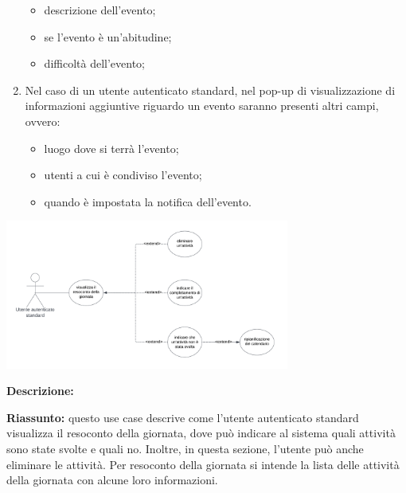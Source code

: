 \begin{listaPersonale}[UC]{}
\begin{enumerate}
\begin{itemize}
                  \item descrizione dell'evento;
                  \item se l'evento è un'abitudine;
                  \item difficoltà dell'evento;
              \end{itemize}
        \item Nel caso di un utente autenticato standard, nel pop-up di visualizzazione di informazioni aggiuntive riguardo un evento saranno presenti altri campi, ovvero:
              \begin{itemize}
                  \item luogo dove si terrà l'evento;
                  \item utenti a cui è condiviso l'evento;
                  \item quando è impostata la notifica dell'evento.
              \end{itemize}
    \end{enumerate}





    \newpage


    \begin{center}
        \includegraphics[width=0.7\textwidth]{img/Diagrammi/UseCases/ResocontoGiornata.png}
    \end{center}

    \textbf{Descrizione:}

    \textbf{Riassunto:} questo use case descrive come l'utente autenticato standard visualizza il resoconto della giornata, dove può indicare al sistema quali attività sono state svolte e quali no. Inoltre, in questa sezione, l'utente può anche eliminare le attività. Per resoconto della giornata si intende la lista delle attività della giornata con alcune loro informazioni.


\end{listaPersonale}
